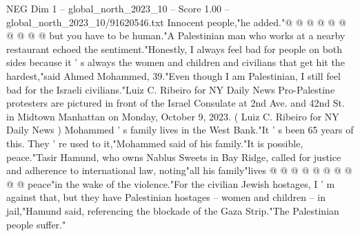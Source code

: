 \begin{textsample}{NEG Dim 1 – global\_north\_2023\_10 – Score 1.00 – global\_north\_2023\_10/91620546.txt}
Innocent people,"he added."@ @ @ @ @ @ @ @ @ @ but you have to be human."A Palestinian man who works at a nearby restaurant echoed the sentiment."Honestly, I always feel bad for people on both sides because it ' s always the women and children and civilians that get hit the hardest,"said Ahmed Mohammed, 39."Even though I am Palestinian, I still feel bad for the Israeli civilians."Luiz C.
Ribeiro for NY Daily News Pro-Palestine protesters are pictured in front of the Israel Consulate at 2nd Ave. and 42nd St. in Midtown Manhattan on Monday, October 9, 2023. ( Luiz C.
Ribeiro for NY Daily News ) Mohammed ' s family lives in the West Bank."It ' s been 65 years of this.
They ' re used to it,"Mohammed said of his family."It is possible, peace."Tasir Hamund, who owns Nablus Sweets in Bay Ridge, called for justice and adherence to international law, noting"all his family"lives @ @ @ @ @ @ @ @ @ @ peace"in the wake of the violence."For the civilian Jewish hostages, I ' m against that, but they have Palestinian hostages -- women and children -- in jail,"Hamund said, referencing the blockade of the Gaza Strip."The Palestinian people suffer."

\end{textsample}
